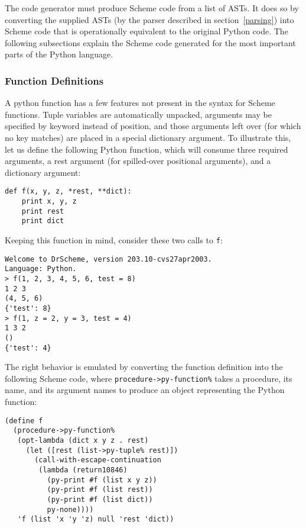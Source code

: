{The code generator must produce Scheme code from a list of ASTs.  It does so by converting the supplied ASTs (by the parser described in section~\ref{parsing}) into Scheme code that is operationally equivalent to the original Python code.  The following subsections explain the Scheme code generated for the most important parts of the Python language.

\subsubsection{Function Definitions}
\label{functions}

A python function has a few features not present in the syntax for Scheme functions.  Tuple variables are automatically unpacked, arguments may be specified by keyword instead of position, and those arguments left over (for which no key matches) are placed in a special dictionary argument.  To illustrate this, let us define the following Python function, which will consume three required arguments, a rest argument (for spilled-over positional arguments), and a dictionary argument:

\begin{verbatim}
def f(x, y, z, *rest, **dict):
    print x, y, z
    print rest
    print dict
\end{verbatim}

Keeping this function in mind, consider these two calls to \verb|f|:

\begin{verbatim}
Welcome to DrScheme, version 203.10-cvs27apr2003.
Language: Python.
> f(1, 2, 3, 4, 5, 6, test = 8)
1 2 3 
(4, 5, 6) 
{'test': 8} 
> f(1, z = 2, y = 3, test = 4)
1 3 2
() 
{'test': 4} 
\end{verbatim}

The right behavior is emulated by converting the function definition into the following Scheme code, where \verb|procedure->py-function%| takes a procedure, its name, and its argument names to produce an object representing the Python function:

\begin{verbatim}
(define f
  (procedure->py-function%
   (opt-lambda (dict x y z . rest)
     (let ([rest (list->py-tuple% rest)])
       (call-with-escape-continuation
        (lambda (return10846)
          (py-print #f (list x y z))
          (py-print #f (list rest))
          (py-print #f (list dict))
          py-none))))
   'f (list 'x 'y 'z) null 'rest 'dict))
\end{verbatim}

}

